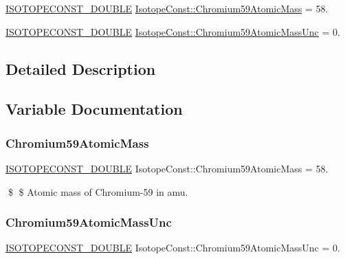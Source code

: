 \begin{DoxyCompactItemize}
\item 
\mbox{\hyperlink{group___isotope_const-_macros_ga8f45a7272ce02c0b4c65c44636ed719a}{I\+S\+O\+T\+O\+P\+E\+C\+O\+N\+S\+T\+\_\+\+D\+O\+U\+B\+LE}} \mbox{\hyperlink{group___isotope_const-_chromium-_cr59_ga53f0811acdf4b803d770a09ffd0acf32}{Isotope\+Const\+::\+Chromium59\+Atomic\+Mass}} = 58.
\item 
\mbox{\hyperlink{group___isotope_const-_macros_ga8f45a7272ce02c0b4c65c44636ed719a}{I\+S\+O\+T\+O\+P\+E\+C\+O\+N\+S\+T\+\_\+\+D\+O\+U\+B\+LE}} \mbox{\hyperlink{group___isotope_const-_chromium-_cr59_gab314fc0357aede8fe5c3388604b4109c}{Isotope\+Const\+::\+Chromium59\+Atomic\+Mass\+Unc}} = 0.
\end{DoxyCompactItemize}


\subsection{Detailed Description}


\subsection{Variable Documentation}
\mbox{\label{group___isotope_const-_chromium-_cr59_ga53f0811acdf4b803d770a09ffd0acf32}} 
\subsubsection{\texorpdfstring{Chromium59\+Atomic\+Mass}{Chromium59AtomicMass}}
{\footnotesize\ttfamily \mbox{\hyperlink{group___isotope_const-_macros_ga8f45a7272ce02c0b4c65c44636ed719a}{I\+S\+O\+T\+O\+P\+E\+C\+O\+N\+S\+T\+\_\+\+D\+O\+U\+B\+LE}} Isotope\+Const\+::\+Chromium59\+Atomic\+Mass = 58.}

\$ \$ Atomic mass of Chromium-\/59 in amu. \mbox{\label{group___isotope_const-_chromium-_cr59_gab314fc0357aede8fe5c3388604b4109c}} 
\subsubsection{\texorpdfstring{Chromium59\+Atomic\+Mass\+Unc}{Chromium59AtomicMassUnc}}
{\footnotesize\ttfamily \mbox{\hyperlink{group___isotope_const-_macros_ga8f45a7272ce02c0b4c65c44636ed719a}{I\+S\+O\+T\+O\+P\+E\+C\+O\+N\+S\+T\+\_\+\+D\+O\+U\+B\+LE}} Isotope\+Const\+::\+Chromium59\+Atomic\+Mass\+Unc = 0.}

